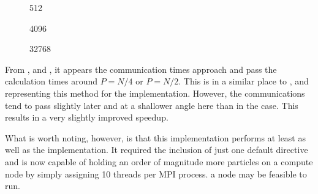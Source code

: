 %
%
\begin{figure}[!h]
    
    \caption{
        \vOneSRTimeCaption
            {\sharedandreplicateddata{}}
            {\pairoperation{}}
            {512}
    }
    \label{fig:v1_shared_and_replicated_pair_operation_512_logtime}
\end  {figure}

\begin{figure}[!h]
    
    \caption{
        \vOneSRTimeCaption{
            \sharedandreplicateddata{}}
            {\pairoperation{}}
            {4096}
    }
    \label{fig:v1_shared_and_replicated_pair_operation_4096_logtime}
\end  {figure}

\begin{figure}[!h]
    
    \caption{
        \vOneSRTimeCaption
            {\sharedandreplicateddata{}}
            {\pairoperation{}}
            {32768}
    }
    \label{fig:v1_shared_and_replicated_pair_operation_32768_logtime}
\end  {figure}

\vOneSRTimeExplanation
    {}
    {}
    {}
    {\pairoperation{}}
    {\sharedandreplicateddata{}}


%
From
,
 and
,
it appears the communication times approach and pass the calculation
times around $P = N/4$ or $P = N/2$.
%
This is in a similar place to
,
 and
representing this method for the \replicateddata{} implementation.
%
However, the communications tend to pass slightly later and at a shallower
angle here than in the \replicateddata{} case.
%
This results in a very slightly improved speedup.

What is worth noting, however, is that this implementation performs
at least as well as the \replicateddata{} implementation.
%
It required the inclusion of just one default \openmp{} directive and
is now capable of holding an order of magnitude more particles on
a compute node by simply assigning 10 \openmp{} threads per MPI process.
a node may be feasible to run.
